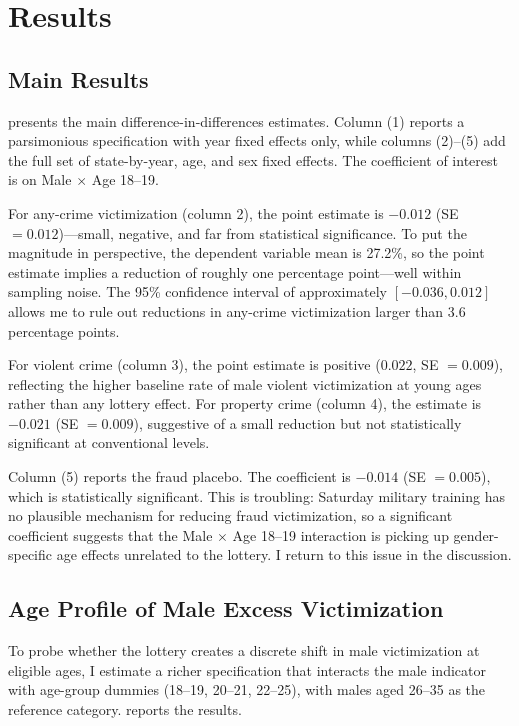 \documentclass[12pt]{article}
\begin{document}
\section{Results}
\label{sec:results}

\subsection{Main Results}

 presents the main difference-in-differences estimates. Column (1) reports a parsimonious specification with year fixed effects only, while columns (2)--(5) add the full set of state-by-year, age, and sex fixed effects. The coefficient of interest is on Male $\times$ Age 18--19.

For any-crime victimization (column 2), the point estimate is $-0.012$ (SE $= 0.012$)---small, negative, and far from statistical significance. To put the magnitude in perspective, the dependent variable mean is 27.2\%, so the point estimate implies a reduction of roughly one percentage point---well within sampling noise. The 95\% confidence interval of approximately $[-0.036, 0.012]$ allows me to rule out reductions in any-crime victimization larger than 3.6 percentage points.

For violent crime (column 3), the point estimate is positive ($0.022$, SE $= 0.009$), reflecting the higher baseline rate of male violent victimization at young ages rather than any lottery effect. For property crime (column 4), the estimate is $-0.021$ (SE $= 0.009$), suggestive of a small reduction but not statistically significant at conventional levels.

Column (5) reports the fraud placebo. The coefficient is $-0.014$ (SE $= 0.005$), which is statistically significant. This is troubling: Saturday military training has no plausible mechanism for reducing fraud victimization, so a significant coefficient suggests that the Male $\times$ Age 18--19 interaction is picking up gender-specific age effects unrelated to the lottery. I return to this issue in the discussion.



\subsection{Age Profile of Male Excess Victimization}

To probe whether the lottery creates a discrete shift in male victimization at eligible ages, I estimate a richer specification that interacts the male indicator with age-group dummies (18--19, 20--21, 22--25), with males aged 26--35 as the reference category.  reports the results.
\end{document}
